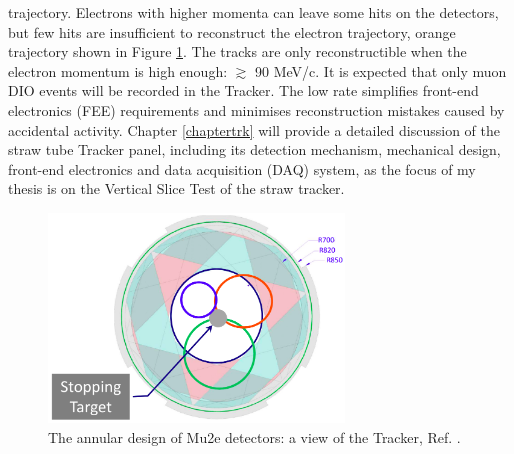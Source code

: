 trajectory. Electrons with higher momenta can leave some hits on the 
detectors, but few hits are insufficient to reconstruct the electron 
trajectory, orange trajectory shown in Figure \ref{fig:sttrk}. The tracks 
are only reconstructible when the electron momentum is high enough: $\gtrsim$ 
90 MeV/c. It is expected that only muon DIO events will be recorded in the 
Tracker. The low rate simplifies front-end electronics (FEE) requirements 
and minimises reconstruction mistakes caused by accidental activity. 
Chapter \ref{chaptertrk} will provide a detailed discussion of the straw 
tube Tracker panel, including its detection mechanism, mechanical design, 
front-end electronics and data acquisition (DAQ) system, as the focus of 
my thesis is on the Vertical Slice Test of the straw tracker.
\begin{figure}[!h]
\centering
\includegraphics[width =0.7\textwidth]{figures/png/Screenshot_20240306_214911.png}
\caption{The annular design of Mu2e detectors: a view of the Tracker, Ref. \cite{trk}.}
\label{fig:sttrk}
\end{figure}
